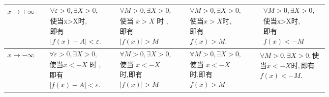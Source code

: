 \documentclass[8pt a4paper, oneside, UTF8]{ctexbook}
\begin{document}
\begin{sloppypar}
\begin{center}
\begin{tabular}{|c|c|c|c|c|}
            $x \to + \infty $ & $\begin{aligned}&\forall\varepsilon>0,\exists X>0, \\&\text{使当x>X时,} \\&\text{即有} \\&|f(x)-A|<\varepsilon.\end{aligned} $                                   & $\begin{aligned}&\forall M>0,\exists X>0, \\&\text{使当 }x>X\text{ 时 }, \\&\text{即有}\\& |f(x)|>M\end{aligned}$                            & $\begin{aligned}&\forall M>0,\exists X>0,\\&\text{使当}x>X\text{时},\\&\text{即有}\\&f(x)>M.\end{aligned}$                        & $\begin{aligned}&\forall M>0,\exists X>0, \\&\text{使当x>X时,} \\&\text{即有}\\&f(x)<-M\end{aligned}$                                 \\ \hline
            $x \to -\infty$   & $\begin{aligned}&\forall\varepsilon>0,\exists X>0, \\&\text{使当}x<-X\text{ 时 }, \\&\text{即有} \\&|f(x)-A|<\varepsilon.\end{aligned}$                          & $\begin{aligned} & \forall M>0 , \exists X> 0,\\&\text{使当 }x<-X \\&\text{时,即有}\\&|f(x)|>M\end{aligned}$                                 & $\begin{aligned} &\forall M>0,\exists X> 0,\\&\text{使当 }x<-X \\&\text{时,即有}\\&f(x)>M\end{aligned}$                           & $\begin{aligned}&\forall M>0,\exists X>0,\text{使}\\&\text{当}x<-X\text{时},\text{即有}\\&f(x)< -M.\end{aligned}$                     \\ \hline

\end{tabular}
\end{center}
\end{sloppypar}
\end{document}
